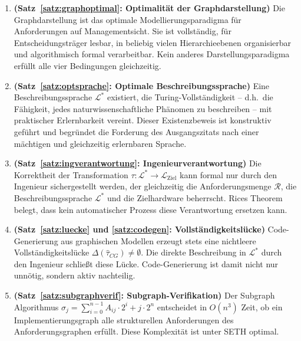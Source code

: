 ﻿\documentclass[a4paper,12pt]{report}
\theoremstyle{definition}
\begin{document}
\begin{enumerate}
  \item \textbf{(Satz~\ref{satz:graphoptimal}: Optimalität der Graphdarstellung)}
        Die Graphdarstellung ist das optimale Modellierungsparadigma für Anforderungen
        auf Managementsicht. Sie ist vollständig, für Entscheidungsträger lesbar,
        in beliebig vielen Hierarchieebenen organisierbar und algorithmisch formal
        verarbeitbar. Kein anderes Darstellungsparadigma erfüllt alle vier Bedingungen
        gleichzeitig.

  \item \textbf{(Satz~\ref{satz:optsprache}: Optimale Beschreibungssprache)}
        Eine Beschreibungssprache $\mathcal{L}^*$ existiert, die Turing-Vollständigkeit
        -- d.h.\ die Fähigkeit, jedes naturwissenschaftliche Phänomen zu beschreiben --
        mit praktischer Erlernbarkeit vereint. Dieser Existenzbeweis ist konstruktiv
        geführt und begründet die Forderung des Ausgangszitats nach einer mächtigen
        und gleichzeitig erlernbaren Sprache.

  \item \textbf{(Satz~\ref{satz:ingverantwortung}: Ingenieurverantwortung)}
        Die Korrektheit der Transformation $\tau: \mathcal{L}^* \to \mathcal{L}_{\text{Ziel}}$
        kann formal nur durch den Ingenieur sichergestellt werden, der gleichzeitig
        die Anforderungsmenge $\mathcal{R}$, die Beschreibungssprache $\mathcal{L}^*$
        und die Zielhardware beherrscht. Rices Theorem belegt, dass kein automatischer
        Prozess diese Verantwortung ersetzen kann.

  \item \textbf{(Satz~\ref{satz:luecke} und \ref{satz:codegen}: Vollständigkeitslücke)}
        Code-Generierung aus graphischen Modellen erzeugt stets eine nichtleere
        Vollständigkeitslücke $\Delta(\hat{\tau}_{CG}) \neq \emptyset$.
        Die direkte Beschreibung in $\mathcal{L}^*$ durch den Ingenieur schließt
        diese Lücke. Code-Generierung ist damit nicht nur unnötig, sondern aktiv nachteilig.

  \item \textbf{(Satz~\ref{satz:subgraphverif}: Subgraph-Verifikation)}
        Der Subgraph Algorithmus
        $\sigma_j = \sum_{i=0}^{n-1} A_{ij} \cdot 2^i + j \cdot 2^n$
        entscheidet in $O(n^3)$ Zeit, ob ein Implementierungsgraph alle strukturellen
        Anforderungen des Anforderungsgraphen erfüllt. Diese Komplexität ist unter SETH
        optimal.


\end{enumerate}
\end{document}
